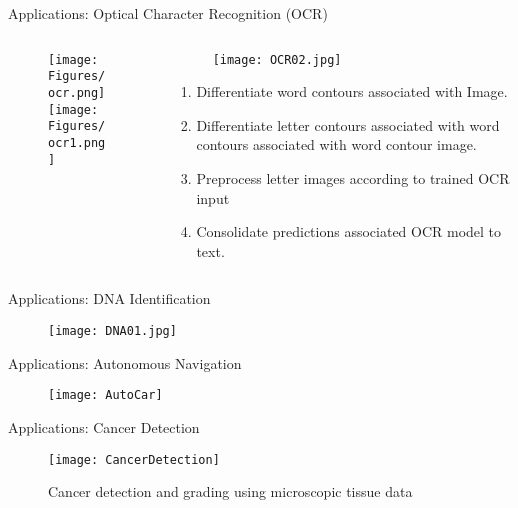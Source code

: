 \begin{frame}{Applications: Optical Character Recognition (OCR)}
\begin{columns}
\begin{column}{5cm}
\begin{figure}
\texttt{[image: Figures/ocr.png]}\\
\texttt{[image: Figures/ocr1.png]}
\end{figure}
\end{column}
\begin{column}{8cm}
\begin{figure}
\texttt{[image: OCR02.jpg]}
\end{figure}
\vspace{-0.5cm}
\begin{enumerate}
\item Differentiate word contours associated with Image.
\item Differentiate letter contours associated with word contours associated with word contour image.
\item Preprocess letter images according to trained OCR input
\item Consolidate predictions associated OCR model to text.
\end{enumerate}
\end{column}
\end{columns}
\end{frame}

\begin{frame}{Applications: DNA Identification}
\begin{figure}
\texttt{[image: DNA01.jpg]}
\end{figure}
\end{frame}

\begin{frame}{Applications: Autonomous Navigation}
\begin{figure}
\texttt{[image: AutoCar]}
\end{figure}
\end{frame}

\begin{frame}{Applications: Cancer Detection}
\begin{figure}
\texttt{[image: CancerDetection]}
\caption{Cancer detection and grading using microscopic tissue data}
\end{figure}
\end{frame}

